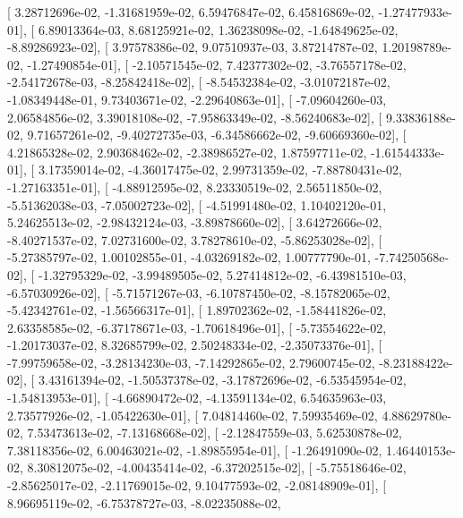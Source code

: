 \documentclass{article}
\begin{document}
       [  3.28712696e-02,  -1.31681959e-02,   6.59476847e-02,
          6.45816869e-02,  -1.27477933e-01],
       [  6.89013364e-03,   8.68125921e-02,   1.36238098e-02,
         -1.64849625e-02,  -8.89286923e-02],
       [  3.97578386e-02,   9.07510937e-03,   3.87214787e-02,
          1.20198789e-02,  -1.27490854e-01],
       [ -2.10571545e-02,   7.42377302e-02,  -3.76557178e-02,
         -2.54172678e-03,  -8.25842418e-02],
       [ -8.54532384e-02,  -3.01072187e-02,  -1.08349448e-01,
          9.73403671e-02,  -2.29640863e-01],
       [ -7.09604260e-03,   2.06584856e-02,   3.39018108e-02,
         -7.95863349e-02,  -8.56240683e-02],
       [  9.33836188e-02,   9.71657261e-02,  -9.40272735e-03,
         -6.34586662e-02,  -9.60669360e-02],
       [  4.21865328e-02,   2.90368462e-02,  -2.38986527e-02,
          1.87597711e-02,  -1.61544333e-01],
       [  3.17359014e-02,  -4.36017475e-02,   2.99731359e-02,
         -7.88780431e-02,  -1.27163351e-01],
       [ -4.88912595e-02,   8.23330519e-02,   2.56511850e-02,
         -5.51362038e-03,  -7.05002723e-02],
       [ -4.51991480e-02,   1.10402120e-01,   5.24625513e-02,
         -2.98432124e-03,  -3.89878660e-02],
       [  3.64272666e-02,  -8.40271537e-02,   7.02731600e-02,
          3.78278610e-02,  -5.86253028e-02],
       [ -5.27385797e-02,   1.00102855e-01,  -4.03269182e-02,
          1.00777790e-01,  -7.74250568e-02],
       [ -1.32795329e-02,  -3.99489505e-02,   5.27414812e-02,
         -6.43981510e-03,  -6.57030926e-02],
       [ -5.71571267e-03,  -6.10787450e-02,  -8.15782065e-02,
         -5.42342761e-02,  -1.56566317e-01],
       [  1.89702362e-02,  -1.58441826e-02,   2.63358585e-02,
         -6.37178671e-03,  -1.70618496e-01],
       [ -5.73554622e-02,  -1.20173037e-02,   8.32685799e-02,
          2.50248334e-02,  -2.35073376e-01],
       [ -7.99759658e-02,  -3.28134230e-03,  -7.14292865e-02,
          2.79600745e-02,  -8.23188422e-02],
       [  3.43161394e-02,  -1.50537378e-02,  -3.17872696e-02,
         -6.53545954e-02,  -1.54813953e-01],
       [ -4.66890472e-02,  -4.13591134e-02,   6.54635963e-03,
          2.73577926e-02,  -1.05422630e-01],
       [  7.04814460e-02,   7.59935469e-02,   4.88629780e-02,
          7.53473613e-02,  -7.13168668e-02],
       [ -2.12847559e-03,   5.62530878e-02,   7.38118356e-02,
          6.00463021e-02,  -1.89855954e-01],
       [ -1.26491090e-02,   1.46440153e-02,   8.30812075e-02,
         -4.00435414e-02,  -6.37202515e-02],
       [ -5.75518646e-02,  -2.85625017e-02,  -2.11769015e-02,
          9.10477593e-02,  -2.08148909e-01],
       [  8.96695119e-02,  -6.75378727e-03,  -8.02235088e-02,
\end{document}
